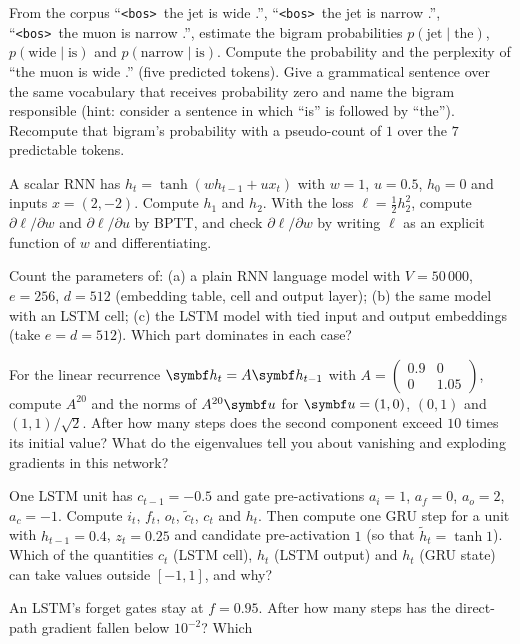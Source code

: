 \documentclass[11pt]{article}
\newcommand{\hv}{\vect{h}}
\newcommand{\bos}{\texttt{<bos>}}
\begin{document}
\begin{questions}
\begin{calculations}
\item From the corpus ``\bos\ the jet is wide .'', ``\bos\ the jet is narrow .'', ``\bos\ the muon is narrow .'', estimate the
  bigram probabilities $p(\text{jet} \mid \text{the})$, $p(\text{wide} \mid \text{is})$ and $p(\text{narrow} \mid \text{is})$.
  Compute the probability and the perplexity of ``the muon is wide .'' (five predicted tokens). Give a grammatical sentence
  over the same vocabulary that receives probability zero and name the bigram responsible (hint: consider a sentence in
  which ``is'' is followed by ``the''). Recompute that bigram's
  probability with a pseudo-count of $1$ over the $7$ predictable tokens.
\item A scalar RNN has $h_t = \tanh(wh_{t-1} + ux_t)$ with $w = 1$, $u = 0.5$, $h_0 = 0$ and inputs $x = (2, -2)$. Compute $h_1$
  and $h_2$. With the loss $\ell = \frac12 h_2^2$, compute $\partial \ell/\partial w$ and $\partial \ell/\partial u$ by BPTT, and check
  $\partial \ell/\partial w$ by writing $\ell$ as an explicit function of $w$ and differentiating.
\item Count the parameters of: (a) a plain RNN language model with $V = 50\,000$, $e = 256$, $d = 512$ (embedding table,
  cell and output layer); (b) the same model with an LSTM cell; (c) the LSTM model with tied input and output embeddings
  (take $e = d = 512$). Which part dominates in each case?
\item For the linear recurrence $\hv_t = A\hv_{t-1}$ with $A = \begin{pmatrix} 0.9 & 0 \\ 0 & 1.05 \end{pmatrix}$, compute
  $A^{20}$ and the norms of $A^{20}\vect{u}$ for $\vect{u} = (1, 0)$, $(0, 1)$ and $(1, 1)/\sqrt2$. After how many steps
  does the second component exceed $10$ times its initial value? What do the eigenvalues tell you about vanishing and
  exploding gradients in this network?
\item One LSTM unit has $c_{t-1} = -0.5$ and gate pre-activations $a_i = 1$, $a_f = 0$, $a_o = 2$, $a_c = -1$. Compute $i_t$,
  $f_t$, $o_t$, $\tilde c_t$, $c_t$ and $h_t$. Then compute one GRU step for a unit with $h_{t-1} = 0.4$, $z_t = 0.25$ and
  candidate pre-activation $1$ (so that $\tilde h_t = \tanh 1$). Which of the quantities $c_t$ (LSTM cell), $h_t$ (LSTM
  output) and $h_t$ (GRU state) can take values outside $[-1, 1]$, and why?
\item An LSTM's forget gates stay at $f = 0.95$. After how many steps has the direct-path gradient fallen below $10^{-2}$? Which

\end{calculations}
\end{questions}
\end{document}
